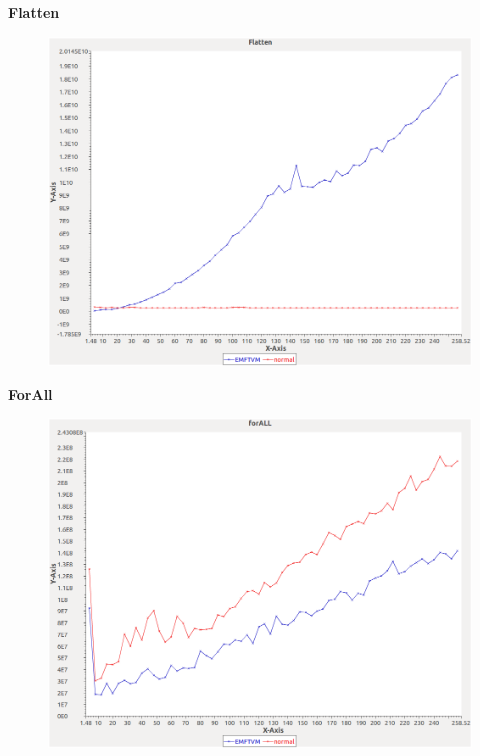 \noindent\textbf{Flatten}

\begin{figure}[h]
\centering
\includegraphics[width=\textwidth]{graphs/sequence/Flatten}
\end{figure}
\pagebreak

\noindent\textbf{ForAll}

\begin{figure}[h]
\centering
\includegraphics[width=\textwidth]{graphs/sequence/forALL}
\end{figure}
\pagebreak

